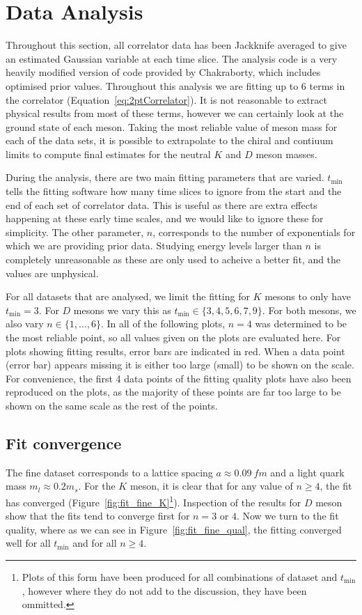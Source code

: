 \documentclass[a4paper,12pt]{article}
\begin{document}
\section{Data Analysis}
Throughout this section, all correlator data has been Jackknife averaged to give an estimated Gaussian variable at each time slice. The analysis code is a very heavily modified version of code provided by Chakraborty, which includes optimised prior values. Throughout this analysis we are fitting up to 6 terms in the correlator (Equation~\ref{eq:2ptCorrelator}). It is not reasonable to extract physical results from most of these terms, however we can certainly look at the ground state of each meson. Taking the most reliable value of meson mass for each of the data sets, it is possible to extrapolate to the chiral and contiuum limits to compute final estimates for the neutral $K$ and $D$ meson masses.

During the analysis, there are two main fitting parameters that are varied. $t_\mathrm{min}$ tells the fitting software how many time slices to ignore from the start and the end of each set of correlator data. This is useful as there are extra effects happening at these early time scales, and we would like to ignore these for simplicity. The other parameter, $n$, corresponds to the number of exponentials for which we are providing prior data. Studying energy levels larger than $n$ is completely unreasonable as these are only used to acheive a better fit, and the values are unphysical.

For all datasets that are analysed, we limit the fitting for $K$ mesons to only have $t_\mathrm{min} = 3$. For $D$ mesons we vary this as $t_\mathrm{min} \in \{3, 4, 5, 6, 7, 9\}$. For both mesons, we also vary $n \in \{1, \ldots, 6\}$. In all of the following plots, $n=4$ was determined to be the most reliable point, so all values given on the plots are evaluated here. For plots showing fitting results, error bars are indicated in red. When a data point (error bar) appears missing it is either too large (small) to be shown on the scale. For convenience, the first 4 data points of the fitting quality plots have also been reproduced on the plots, as the majority of these points are far too large to be shown on the same scale as the rest of the points.

\subsection{Fit convergence}
The fine dataset corresponds to a lattice spacing $a \approx \SI{0.09}{fm}$ and a light quark mass $m_l \approx 0.2 m_s$. For the $K$ meson, it is clear that for any value of $n\geq4$, the fit has converged (Figure~\ref{fig:fit_fine_K}\footnote{Plots of this form have been produced for all combinations of dataset and $t_\mathrm{min}$, however where they do not add to the discussion, they have been ommitted.}). Inspection of the results for $D$ meson show that the fits tend to converge first for $n=3$ or $4$. Now we turn to the fit quality, where as we can see in Figure~\ref{fig:fit_fine_qual}, the fitting converged well for all $t_\mathrm{min}$ and for all $n \geq 4$.
\end{document}
